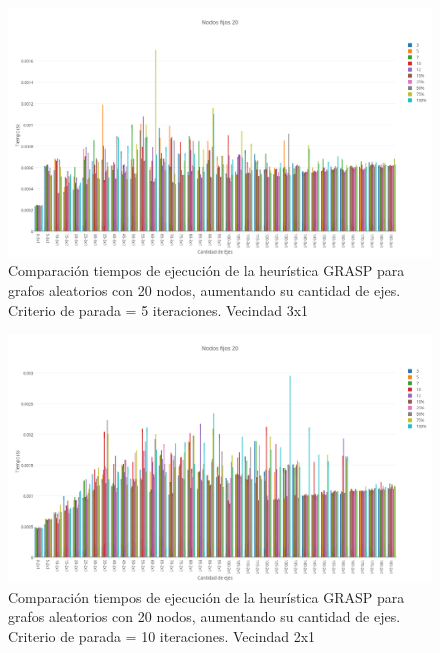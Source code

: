   \begin{figure}[h!]
   \begin{center}
 	\includegraphics[scale=0.35]{imagenes/grasp/20nodos-5repes-v2.png}
 	\caption{Comparaci\'on tiempos de ejecuci\'on de la heur\'istica GRASP para grafos aleatorios con 20 nodos, aumentando su cantidad de ejes. Criterio de parada = 5 iteraciones. Vecindad 3x1}
   \end{center}
 \end{figure}
\newpage
  \begin{figure}[h!]
   \begin{center}
 	\includegraphics[scale=0.35]{imagenes/grasp/20nodos-10repes-v1.png}
 	\caption{Comparaci\'on tiempos de ejecuci\'on de la heur\'istica GRASP para grafos aleatorios con 20 nodos, aumentando su cantidad de ejes. Criterio de parada = 10 iteraciones. Vecindad 2x1}
   \end{center}
 \end{figure}

